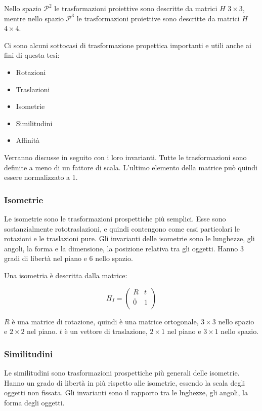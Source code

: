 Nello spazio $\mathcal{P}^2$ le trasformazioni proiettive sono descritte da matrici $H$ $3\times3$, mentre nello spazio $\mathcal{P}^3$ le trasformazioni proiettive sono descritte da matrici $H$ $4\times4$.

Ci sono alcuni sottocasi di trasformazione propettica importanti e utili anche ai fini di questa tesi:

\begin{itemize}
 \item Rotazioni
 \item Traslazioni
 \item Isometrie
 \item Similitudini
 \item Affinità
\end{itemize}

Verranno discusse in seguito con i loro invarianti.
Tutte le trasformazioni sono definite a meno di un fattore di scala. L'ultimo elemento della matrice può quindi essere normalizzato a 1.

\subsubsection{Isometrie}

Le isometrie sono le trasformazioni prospettiche più semplici. Esse sono sostanzialmente rototraslazioni, e quindi contengono come casi particolari le rotazioni e le traslazioni pure. Gli invarianti delle isometrie sono le lunghezze, gli angoli, la forma e la dimensione, la posizione relativa tra gli oggetti. Hanno 3 gradi di libertà nel piano e 6 nello spazio.

Una isometria è descritta dalla matrice:

\begin{equation*}
  H_I = \begin{pmatrix}
   R & t \\
   \overline{0} & 1 \\
  \end{pmatrix}
\end{equation*}

$R$ è una matrice di rotazione, quindi è una matrice ortogonale, $3\times 3$ nello spazio e $2\times 2$ nel piano.
$t$ è un vettore di traslazione, $2\times 1$ nel piano e $3\times 1$ nello spazio.

\subsubsection{Similitudini}
Le similitudini sono trasformazioni prospettiche più generali delle isometrie. Hanno un grado di libertà in più rispetto alle isometrie, essendo la scala degli oggetti non fissata. Gli invarianti sono il rapporto tra le lnghezze, gli angoli, la forma degli oggetti.

